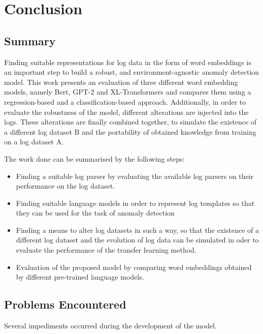 \chapter{Conclusion\label{cha:conclusion}}



\section{Summary\label{sec:summary}}

Finding suitable representations for log data in the form of word embeddings is an important step to build a robust, and environment-agnostic anomaly detection model. This work presents an evaluation of three different word embedding models, namely Bert, GPT-2 and XL-Transformers and compares them using a regression-based and a classification-based approach. Additionally, in order to evaluate the robustness of the model, different alterations are injected into the logs. These alterations are finally combined together, to simulate the existence of a different log dataset B and the portability of obtained knowledge from training on a log dataset A.

The work done can be summarised by the following steps:
\begin{itemize}
		\item Finding a suitable log parser by evaluating the available log parsers on their performance on the log dataset.
		\item Finding suitable language models in order to represent log templates so that they can be used for the task of anomaly detection
		\item Finding a means to alter log datasets in such a way, so that the existence of a different log dataset and the evolution of log data can be simulated in oder to evaluate the performance of the transfer learning method.
		\item Evaluation of the proposed model by comparing word embeddings obtained by different pre-trained language models.
\end{itemize}


\section{Problems Encountered\label{sec:problems}}
Several impediments occurred during the development of the model. 

